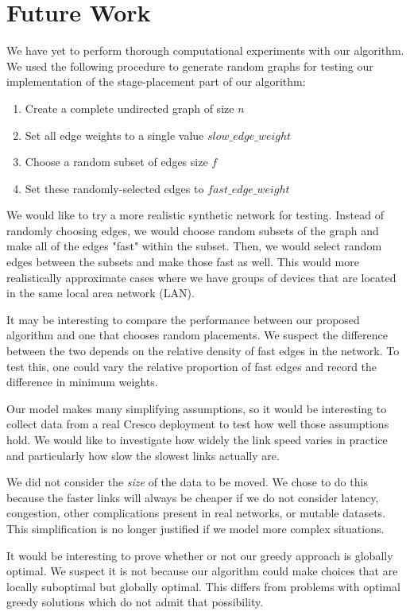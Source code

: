 \documentclass{acmart}
\begin{document}
 	\section{Future Work}
 	We have yet to perform thorough computational experiments with our algorithm. We used the following procedure to generate random graphs for testing our implementation of the stage-placement part of our algorithm:
 	\begin{enumerate}
 		\item Create a complete undirected graph of size $n$
 		\item Set all edge weights to a single value $slow\_edge\_weight$
 		\item Choose a random subset of edges size $f$
 		\item Set these randomly-selected edges to $fast\_edge\_weight$
 	\end{enumerate}
 	
 	We would like to try a more realistic synthetic network for testing. Instead of randomly choosing edges, we would choose random subsets of the graph and make all of the edges "fast" within the subset. Then, we would select random edges between the subsets and make those fast as well. This would more realistically approximate cases where we have groups of devices that are located in the same local area network (LAN).
 	
 	 It may be interesting to compare the performance between our proposed algorithm and one that chooses random placements. We suspect the difference between the two depends on the relative density of fast edges in the network. To test this, one could vary the relative proportion of fast edges and record the difference in minimum weights.
 	 
 	 Our model makes many simplifying assumptions, so it would be interesting to collect data from a real Cresco deployment to test how well those assumptions hold. We would like to investigate how widely the link speed varies in practice and particularly how slow the slowest links actually are.
 	 
 	 We did not consider the \textit{size} of the data to be moved. We chose to do this because the faster links will always be cheaper if we do not consider latency, congestion, other complications present in real networks, or mutable datasets. This simplification is no longer justified if we model more complex situations.
 	 
 	 It would be interesting to prove whether or not our greedy approach is globally optimal. We suspect it is not because our algorithm could make choices that are locally suboptimal but globally optimal. This differs from problems with optimal greedy solutions which do not admit that possibility.
 	  
\end{document}
